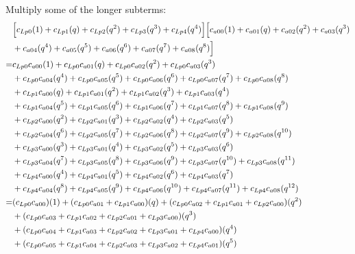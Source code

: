 \documentclass[12pt]{article}
\begin{document}
Multiply some of the longer subterms:
\begin{align}
    &\Bigl[ c_{Lp0}(1) +  c_{Lp1}(q) + c_{Lp2}(q^2) + c_{Lp3}(q^3) + c_{Lp4}(q^4)  \Bigr]\Bigl[ c_{a00}(1) + c_{a01}(q) + c_{a02}(q^2) + c_{a03}(q^3) \nonumber\\
    &+ c_{a04}(q^4) + c_{a05}(q^5) + c_{a06}(q^6) + c_{a07}(q^7) +c_{a08}(q^8)  \Bigr] \nonumber\\
    =& c_{Lp0}c_{a00}(1) + c_{Lp0}c_{a01}(q) + c_{Lp0}c_{a02}(q^2) + c_{Lp0}c_{a03}(q^3) \nonumber\\
    &+ c_{Lp0}c_{a04}(q^4) + c_{Lp0}c_{a05}(q^5) + c_{Lp0}c_{a06}(q^6) + c_{Lp0}c_{a07}(q^7) +c_{Lp0}c_{a08}(q^8)  \nonumber\\
    &+  c_{Lp1}c_{a00}(q) + c_{Lp1}c_{a01}(q^2) + c_{Lp1}c_{a02}(q^3) + c_{Lp1}c_{a03}(q^4) \nonumber\\
    &+ c_{Lp1}c_{a04}(q^5) + c_{Lp1}c_{a05}(q^6) + c_{Lp1}c_{a06}(q^7) + c_{Lp1}c_{a07}(q^8) +c_{Lp1}c_{a08}(q^9)  \nonumber\\
    &+ c_{Lp2}c_{a00}(q^2) + c_{Lp2}c_{a01}(q^3) + c_{Lp2}c_{a02}(q^4) + c_{Lp2}c_{a03}(q^5) \nonumber\\
    &+ c_{Lp2}c_{a04}(q^6) + c_{Lp2}c_{a05}(q^7) + c_{Lp2}c_{a06}(q^8) + c_{Lp2}c_{a07}(q^9) +c_{Lp2}c_{a08}(q^{10})  \nonumber\\
    &+ c_{Lp3}c_{a00}(q^3) + c_{Lp3}c_{a01}(q^4) + c_{Lp3}c_{a02}(q^5) + c_{Lp3}c_{a03}(q^6) \nonumber\\
    &+ c_{Lp3}c_{a04}(q^7) + c_{Lp3}c_{a05}(q^8) + c_{Lp3}c_{a06}(q^9) + c_{Lp3}c_{a07}(q^{10}) +c_{Lp3}c_{a08}(q^{11})  \nonumber\\
    &+ c_{Lp4}c_{a00}(q^4) + c_{Lp4}c_{a01}(q^5) + c_{Lp4}c_{a02}(q^6) + c_{Lp4}c_{a03}(q^7) \nonumber\\
    &+ c_{Lp4}c_{a04}(q^8) + c_{Lp4}c_{a05}(q^9) + c_{Lp4}c_{a06}(q^{10}) + c_{Lp4}c_{a07}(q^{11}) +c_{Lp4}c_{a08}(q^{12}) \\
    =& (c_{Lp0}c_{a00})(1)  + (c_{Lp0}c_{a01} + c_{Lp1}c_{a00})(q) + (c_{Lp0}c_{a02} + c_{Lp1}c_{a01} + c_{Lp2}c_{a00})(q^2) \nonumber\\
    &+ (c_{Lp0}c_{a03} + c_{Lp1}c_{a02} + c_{Lp2}c_{a01} + c_{Lp3}c_{a00})(q^3) \nonumber\\
    &+ (c_{Lp0}c_{a04} + c_{Lp1}c_{a03} + c_{Lp2}c_{a02} + c_{Lp3}c_{a01} + c_{Lp4}c_{a00} )(q^4) \nonumber\\
    &+ (c_{Lp0}c_{a05} + c_{Lp1}c_{a04} + c_{Lp2}c_{a03} + c_{Lp3}c_{a02} + c_{Lp4}c_{a01})(q^5) \nonumber\\

\end{align}
\end{document}
